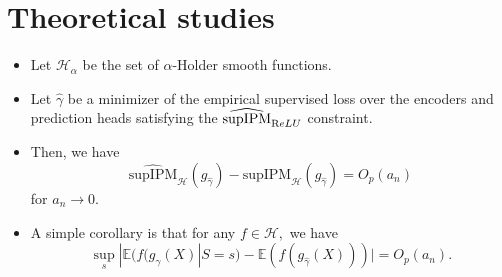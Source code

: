 \documentclass{article}
\begin{document}
\section{Theoretical studies}

\begin{itemize}
    \item Let $\mathcal{H}_\alpha$ be the set of $\alpha$-Holder smooth functions.
    \item Let $\hat{\gamma}$ be a minimizer of the empirical supervised loss over the encoders and prediction heads satisfying the $\widehat{\text{supIPM}}_{\text ReLU}$ constraint.
    \item Then, we have
    $$\widehat{\text{supIPM}}_{\mathcal{H}}(g_{\hat{\gamma}})
    - \text{supIPM}_{\mathcal{H}}(g_{\hat{\gamma}}) = O_p(a_n)$$
    for $a_n\rightarrow 0.$
    \item A simple corollary is that for any $f\in \mathcal{H},$ we have
    $$\sup_s | \mathbb{E}(f(g_{\hat{\gamma}}(X)|S=s)-\mathbb{E}(f(g_{\hat{\gamma}}(X)))|
   = O_p(a_n).$$

    
\end{itemize}



 

\end{document}
